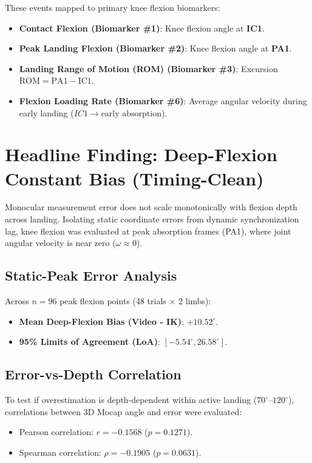 These events mapped to primary knee flexion biomarkers:
\begin{itemize}
  \item \textbf{Contact Flexion (Biomarker \protect\#1)}: Knee flexion angle at \textbf{IC1}.
  \item \textbf{Peak Landing Flexion (Biomarker \protect\#2)}: Knee flexion angle at \textbf{PA1}.
  \item \textbf{Landing Range of Motion (ROM) (Biomarker \protect\#3)}: Excursion $\text{ROM} = \text{PA1} - \text{IC1}$.
  \item \textbf{Flexion Loading Rate (Biomarker \protect\#6)}: Average angular velocity during early landing ($IC1 \rightarrow \text{early absorption}$).
\end{itemize}



\section{Headline Finding: Deep-Flexion Constant Bias (Timing-Clean)}
\label{sec:6-2-headline-finding-deep-flexion-constant-bias-timing-clean}


Monocular measurement error does not scale monotonically with flexion depth across landing. Isolating static coordinate errors from dynamic synchronization lag, knee flexion was evaluated at peak absorption frames (PA1), where joint angular velocity is near zero ($\omega \approx 0$).

\subsection{Static-Peak Error Analysis}
\label{sec:6-2-1-static-peak-error-analysis}

Across $n = 96$ peak flexion points (48 trials $\times$ 2 limbs):
\begin{itemize}
  \item \textbf{Mean Deep-Flexion Bias (Video - IK)}: \textbf{$+10.52^\circ$}.
  \item \textbf{95\% Limits of Agreement (LoA)}: \textbf{$[-5.54^\circ, 26.58^\circ]$}.
\end{itemize}

\subsection{Error-vs-Depth Correlation}
\label{sec:6-2-2-error-vs-depth-correlation}

To test if overestimation is depth-dependent within active landing ($70^\circ\text{--}120^\circ$), correlations between 3D Mocap angle and error were evaluated:
\begin{itemize}
  \item Pearson correlation: $r = -0.1568$ ($p = 0.1271$).
  \item Spearman correlation: $\rho = -0.1905$ ($p = 0.0631$).
\end{itemize}

